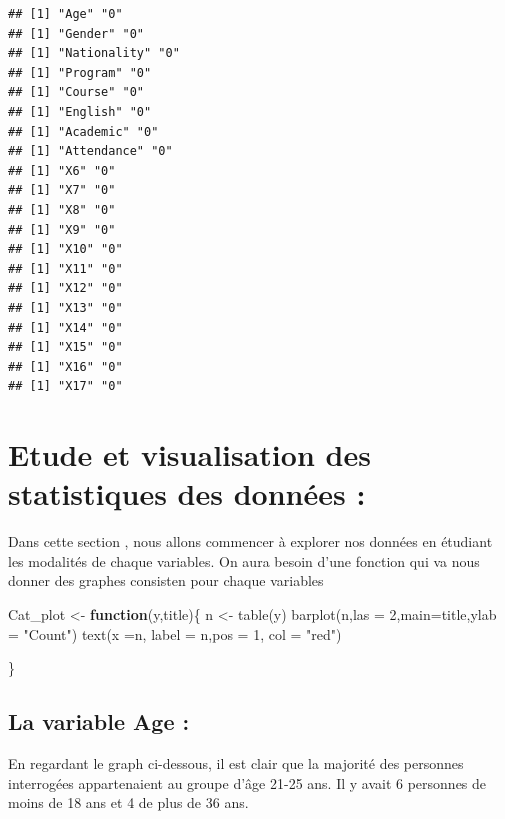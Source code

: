 \documentclass[
]{article}
\newenvironment{Shaded}{\begin{snugshade}}{\end{snugshade}}
\newcommand{\AttributeTok}[1]{\textcolor[rgb]{0.77,0.63,0.00}{#1}}
\newcommand{\ControlFlowTok}[1]{\textcolor[rgb]{0.13,0.29,0.53}{\textbf{#1}}}
\newcommand{\DecValTok}[1]{\textcolor[rgb]{0.00,0.00,0.81}{#1}}
\newcommand{\FunctionTok}[1]{\textcolor[rgb]{0.00,0.00,0.00}{#1}}
\newcommand{\NormalTok}[1]{#1}
\newcommand{\OtherTok}[1]{\textcolor[rgb]{0.56,0.35,0.01}{#1}}
\newcommand{\StringTok}[1]{\textcolor[rgb]{0.31,0.60,0.02}{#1}}
\begin{document}
\begin{verbatim}
## [1] "Age" "0"  
## [1] "Gender" "0"     
## [1] "Nationality" "0"          
## [1] "Program" "0"      
## [1] "Course" "0"     
## [1] "English" "0"      
## [1] "Academic" "0"       
## [1] "Attendance" "0"         
## [1] "X6" "0" 
## [1] "X7" "0" 
## [1] "X8" "0" 
## [1] "X9" "0" 
## [1] "X10" "0"  
## [1] "X11" "0"  
## [1] "X12" "0"  
## [1] "X13" "0"  
## [1] "X14" "0"  
## [1] "X15" "0"  
## [1] "X16" "0"  
## [1] "X17" "0"
\end{verbatim}

\hypertarget{etude-et-visualisation-des-statistiques-des-donnuxe9es}{%
\section{Etude et visualisation des statistiques des données
:}\label{etude-et-visualisation-des-statistiques-des-donnuxe9es}}

Dans cette section , nous allons commencer à explorer nos données en
étudiant les modalités de chaque variables. On aura besoin d'une
fonction qui va nous donner des graphes consisten pour chaque variables

\begin{Shaded}
\begin{Highlighting}[]
\NormalTok{Cat\_plot }\OtherTok{\textless{}{-}} \ControlFlowTok{function}\NormalTok{(y,title)\{}
\NormalTok{  n }\OtherTok{\textless{}{-}} \FunctionTok{table}\NormalTok{(y)}
  \FunctionTok{barplot}\NormalTok{(n,}\AttributeTok{las =} \DecValTok{2}\NormalTok{,}\AttributeTok{main=}\NormalTok{title,}\AttributeTok{ylab =} \StringTok{"Count"}\NormalTok{)}
  \FunctionTok{text}\NormalTok{(}\AttributeTok{x =}\NormalTok{n, }\AttributeTok{label =}\NormalTok{ n,}\AttributeTok{pos =} \DecValTok{1}\NormalTok{, }\AttributeTok{col =} \StringTok{"red"}\NormalTok{)}
  
\NormalTok{\}}
\end{Highlighting}
\end{Shaded}

\hypertarget{la-variable-age}{%
\subsection{La variable Age :}\label{la-variable-age}}

En regardant le graph ci-dessous, il est clair que la majorité des
personnes interrogées appartenaient au groupe d'âge 21-25 ans. Il y
avait 6 personnes de moins de 18 ans et 4 de plus de 36 ans.
\end{document}
